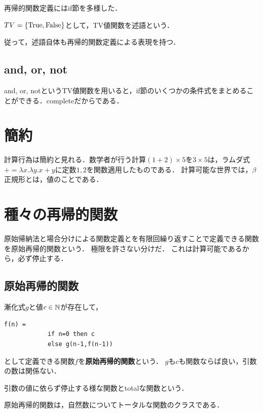 \documentclass[uplatex, dvipdfmx]{jsreport}
\begin{document}
再帰的関数定義にはif節を多様した．
\begin{definition}[predicate]
    $TV=\{\mathrm{True},\mathrm{False}\}$として，TV値関数を述語という．
\end{definition}
従って，述語自体も再帰的関数定義による表現を持つ．

\subsection{and, or, not}

and, or, notというTV値関数を用いると，if節のいくつかの条件式をまとめることができる．completeだからである．

\section{簡約}

計算行為は簡約と見れる．数学者が行う計算$(1+2)\times 5$を$3\times 5$は，ラムダ式$+=\lambda x.\lambda y.x+y$に定数$1,2$を関数適用したものである．
計算可能な世界では，$\beta$正規形とは，値のことである．

\section{種々の再帰的関数}

原始帰納法と場合分けによる関数定義とを有限回繰り返すことで定義できる関数を原始再帰的関数という．
極限を許さない分けだ．
これは計算可能であるから，必ず停止する．

\subsection{原始再帰的関数}

\begin{definition}
    漸化式$g$と値$c\in\mathbb{N}$が存在して，
    \begin{lstlisting}[caption=primitive recursive function]
        f(n) = 
            if n=0 then c
            else g(n-1,f(n-1))
    \end{lstlisting}
    として定義できる関数$f$を\textbf{原始再帰的関数}という．
    $g$も$c$も関数ならば良い，引数の数は関係ない．
\end{definition}

\begin{definition}[total]
    引数の値に依らず停止する様な関数とtotalな関数という．
\end{definition}
\begin{remark}
    原始再帰的関数は，自然数についてトータルな関数のクラスである．
\end{remark}
\end{document}
